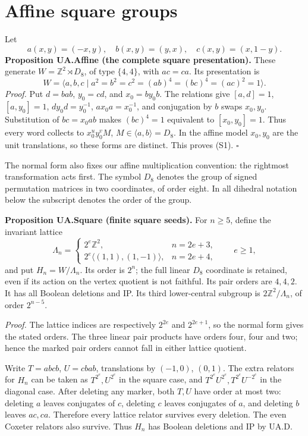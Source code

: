 \section{Affine square groups}\label{affine-square-groups}

Let \[
 a(x,y)=(-x,y),\quad b(x,y)=(y,x),\quad c(x,y)=(x,1-y).
\] \textbf{Proposition UA.Affine (the complete square presentation).}
These generate \(W=\mathbb Z^2\rtimes D_8\), of type \(\{4,4\}\), with
\(ac=ca\). Its presentation is \[
 W=\langle a,b,c\mid a^2=b^2=c^2=(ab)^4=(bc)^4=(ac)^2=1\rangle. \tag{S1}
\] \emph{Proof.} Put \(d=bab\), \(y_0=cd\), and \(x_0=by_0b\). The
relations give \([a,d]=1\), \([a,y_0]=1\), \(dy_0d=y_0^{-1}\),
\(ax_0a=x_0^{-1}\), and conjugation by \(b\) swaps \(x_0,y_0\).
Substitution of \(bc=x_0ab\) makes \((bc)^4=1\) equivalent to
\([x_0,y_0]=1\). Thus every word collects to \(x_0^u y_0^v M\),
\(M\in\langle a,b\rangle=D_8\). In the affine model \(x_0,y_0\) are the
unit translations, so these forms are distinct. This proves (S1).
\(\square\)

The normal form also fixes our affine multiplication convention: the
rightmost transformation acts first. The symbol \(D_8\) denotes the
group of signed permutation matrices in two coordinates, of order eight.
In all dihedral notation below the subscript denotes the order of the
group.

\textbf{Proposition UA.Square (finite square seeds).} For \(n\ge5\),
define the invariant lattice \[
 \Lambda_n=\begin{cases}
  2^e\mathbb Z^2,&n=2e+3,\\
  2^e\langle(1,1),(1,-1)\rangle,&n=2e+4,
 \end{cases}\qquad e\ge1,
\] and put \(H_n=W/\Lambda_n\). Its order is \(2^n\); the full linear
\(D_8\) coordinate is retained, even if its action on the vertex
quotient is not faithful. Its pair orders are \(4,4,2\). It has all
Boolean deletions and IP. Its third lower-central subgroup is
\(2\mathbb Z^2/\Lambda_n\), of order \(2^{n-5}\).

\emph{Proof.} The lattice indices are respectively \(2^{2e}\) and
\(2^{2e+1}\), so the normal form gives the stated orders. The three
linear pair products have orders four, four and two; hence the marked
pair orders cannot fall in either lattice quotient.

Write \(T=abcb\), \(U=cbab\), translations by \((-1,0)\), \((0,1)\). The
extra relators for \(H_n\) can be taken as \(T^{2^e},U^{2^e}\) in the
square case, and \(T^{2^e}U^{2^e},T^{2^e}U^{-2^e}\) in the diagonal
case. After deleting any marker, both \(T,U\) have order at most two:
deleting \(a\) leaves conjugates of \(c\), deleting \(c\) leaves
conjugates of \(a\), and deleting \(b\) leaves \(ac,ca\). Therefore
every lattice relator survives every deletion. The even Coxeter relators
also survive. Thus \(H_n\) has Boolean deletions and IP by UA.D.

